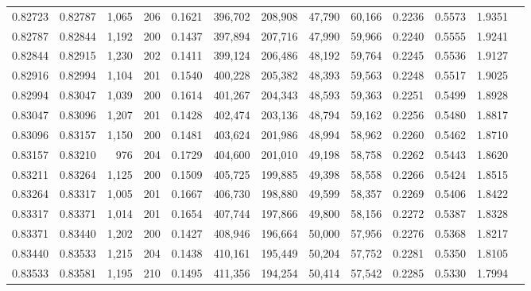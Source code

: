 \begin{tabular}{rrrrrrrrrrrrr}
0.82723 & 0.82787 & 1,065 & 206 &                                     0.1621 & 396,702 & 208,908 &  47,790 &  60,166 & 0.2236 & 0.5573 & 1.9351 \\
0.82787 & 0.82844 & 1,192 & 200 &                                     0.1437 & 397,894 & 207,716 &  47,990 &  59,966 & 0.2240 & 0.5555 & 1.9241 \\
0.82844 & 0.82915 & 1,230 & 202 &                                     0.1411 & 399,124 & 206,486 &  48,192 &  59,764 & 0.2245 & 0.5536 & 1.9127 \\
0.82916 & 0.82994 & 1,104 & 201 &                                     0.1540 & 400,228 & 205,382 &  48,393 &  59,563 & 0.2248 & 0.5517 & 1.9025 \\
0.82994 & 0.83047 & 1,039 & 200 &                                     0.1614 & 401,267 & 204,343 &  48,593 &  59,363 & 0.2251 & 0.5499 & 1.8928 \\
0.83047 & 0.83096 & 1,207 & 201 &                                     0.1428 & 402,474 & 203,136 &  48,794 &  59,162 & 0.2256 & 0.5480 & 1.8817 \\
0.83096 & 0.83157 & 1,150 & 200 &                                     0.1481 & 403,624 & 201,986 &  48,994 &  58,962 & 0.2260 & 0.5462 & 1.8710 \\
0.83157 & 0.83210 &   976 & 204 &                                     0.1729 & 404,600 & 201,010 &  49,198 &  58,758 & 0.2262 & 0.5443 & 1.8620 \\
0.83211 & 0.83264 & 1,125 & 200 &                                     0.1509 & 405,725 & 199,885 &  49,398 &  58,558 & 0.2266 & 0.5424 & 1.8515 \\
0.83264 & 0.83317 & 1,005 & 201 &                                     0.1667 & 406,730 & 198,880 &  49,599 &  58,357 & 0.2269 & 0.5406 & 1.8422 \\
0.83317 & 0.83371 & 1,014 & 201 &                                     0.1654 & 407,744 & 197,866 &  49,800 &  58,156 & 0.2272 & 0.5387 & 1.8328 \\
0.83371 & 0.83440 & 1,202 & 200 &                                     0.1427 & 408,946 & 196,664 &  50,000 &  57,956 & 0.2276 & 0.5368 & 1.8217 \\
0.83440 & 0.83533 & 1,215 & 204 &                                     0.1438 & 410,161 & 195,449 &  50,204 &  57,752 & 0.2281 & 0.5350 & 1.8105 \\
0.83533 & 0.83581 & 1,195 & 210 &                                     0.1495 & 411,356 & 194,254 &  50,414 &  57,542 & 0.2285 & 0.5330 & 1.7994 \\

\end{tabular}
